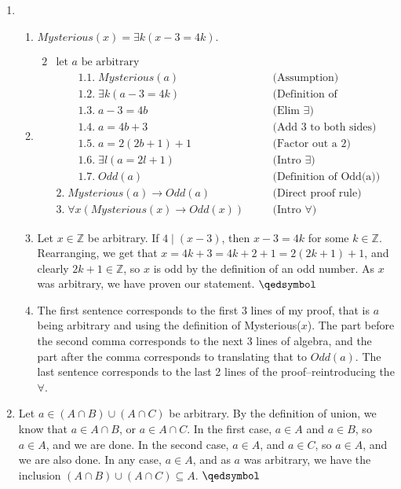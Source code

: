 \documentclass[12pt]{article}
\def\mbb#1{\mathbb{#1}}
\def\bZ{\mbb{Z}}
\theoremstyle{definition}
\theoremstyle{remark}
\renewcommand{\qed}{\hfill\qedsymbol}
\newcommand\setItemnumber[1]{\setcounter{enumi}{\numexpr#1-1\relax}}
\newcommand{\justif}[1]{&\quad &\text{(#1)}}
\newcommand{\ra}{\rightarrow}
\begin{document}
\begin{enumerate}[leftmargin=\labelsep]
		\newpage
		\setItemnumber{3}
		\item 
		\begin{enumerate}
			\item $Mysterious(x) = \exists k (x-3 = 4k)$.
			\item 
			\begin{alignat*}{2}
				&\text{let $a$ be arbitrary} \\
				&\qquad 1.1. \; Mysterious(a) \justif{Assumption} \\
				&\qquad 1.2. \; \exists k (a-3 = 4k) \justif{Definition of Mysterious(a)} \\
				&\qquad 1.3. \; a-3 = 4b \justif{Elim $\exists$} \\
				&\qquad 1.4. \; a = 4b+3 \justif{Add 3 to both sides} \\
				&\qquad 1.5. \; a = 2(2b+1) + 1 \justif{Factor out a 2}  \\
				&\qquad 1.6. \; \exists l (a = 2l + 1) \justif{Intro $\exists$} \\
				&\qquad 1.7. \; Odd(a) \justif{Definition of Odd(a)} \\
				&2. \; Mysterious(a) \ra Odd(a) \justif{Direct proof rule} \\
				&3. \; \forall x (Mysterious(x) \ra Odd(x)) \justif{Intro $\forall$}
			\end{alignat*}
			\item Let $x \in \bZ$ be arbitrary. If $4 \mid (x-3)$, then $x-3 = 4k$ for some $k \in \bZ$. Rearranging, we get that $x = 4k+3=4k+2+1=2(2k+1)+1$, and clearly $2k+1 \in \bZ$, so $x$ is odd by the definition of an odd number. As $x$ was arbitrary, we have proven our statement. $\qed$
			\item The first sentence corresponds to the first 3 lines of my proof, that is $a$ being arbitrary and using the definition of Mysterious($x$). The part before the second comma corresponds to the next 3 lines of algebra, and the part after the comma corresponds to translating that to $Odd(a)$. The last sentence corresponds to the last 2 lines of the proof--reintroducing the $\forall$.
		\end{enumerate}
	
		\newpage
		\item 
		Let $a \in (A \cap B) \cup (A \cap C)$ be arbitrary. By the definition of union, we know that $a \in A \cap B$, or $a \in A \cap C$. In the first case, $a \in A$ and $a \in B$, so $a \in A$, and we are done. In the second case, $ a \in A$, and $a \in C$, so $a \in A$, and we are also done. In any case, $a \in A$, and as $a$ was arbitrary, we have the inclusion $(A \cap B) \cup (A \cap C) \subseteq A$. $\qed$
		

\end{enumerate}
\end{document}
